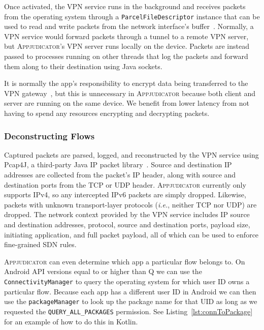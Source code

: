 Once activated, the VPN service runs in the background and receives packets from
the operating system through a \texttt{ParcelFileDescriptor} instance that can
be used to read and write packets from the network interface's
buffer~\cite{vpnguide}.  Normally, a VPN service would forward packets through a
tunnel to a remote VPN server, but \textsc{Appjudicator}'s VPN server runs
locally on the device.  Packets are instead passed to processes running on other
threads that log the packets and forward them along to their destination using
Java sockets.

It is normally the app's responsibility to encrypt data being transferred to the
VPN gateway~\cite{vpnguide}, but this is unnecessary in \textsc{Appjudicator}
because both client and server are running on the same device. We benefit from
lower latency from not having to spend any resources encrypting and decrypting
packets.

\subsubsection{Deconstructing Flows}
\label{sec:deconstructing-flows}

Captured packets are parsed, logged, and reconstructed by the VPN service using
Pcap4J, a third-party Java IP packet library~\cite{kaito2016}. Source and
destination IP addresses are collected from the packet's IP header, along with
source and destination ports from the TCP or UDP header. \textsc{Appjudicator}
currently only supports IPv4, so any intercepted IPv6 packets are simply
dropped. Likewise, packets with unknown transport-layer protocols
(\textit{i.e.}, neither TCP nor UDP) are dropped. The network context provided
by the VPN service includes IP source and destination addresses, protocol,
source and destination ports, payload size, initiating application, and full
packet payload, all of which can be used to enforce fine-grained SDN rules.

\textsc{Appjudicator} can even determine which app a particular flow belongs to.
On Android API versions equal to or higher than Q we can use the
\texttt{ConnectivityManager} to query the operating system for which user ID
owns a particular flow. Because each app has a different user ID in Android we
can then use the \texttt{packageManager} to look up the package name for that
UID as long as we requested the \texttt{QUERY\_ALL\_PACKAGES} permission. See
Listing~\ref{lst:connToPackage} for an example of how to do this in Kotlin.

